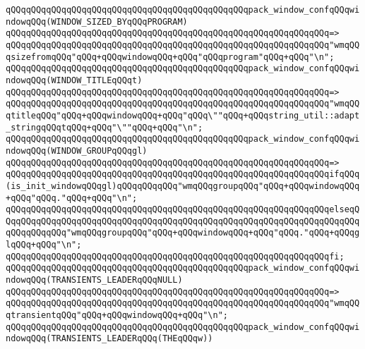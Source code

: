 \verb|qQQqqQQqqQQqqQQqqQQqqQQqqQQqqQQqqQQqqQQqqQQqqQQqpack_window_confqQQqwindowqQQq(WINDOW_SIZED_BYqQQqPROGRAM)|\newline
\verb|qQQqqQQqqQQqqQQqqQQqqQQqqQQqqQQqqQQqqQQqqQQqqQQqqQQqqQQqqQQqqQQq=>|\newline
\verb|qQQqqQQqqQQqqQQqqQQqqQQqqQQqqQQqqQQqqQQqqQQqqQQqqQQqqQQqqQQqqQQq"wmqQQqsizefromqQQq"qQQq+qQQqwindowqQQq+qQQq"qQQqprogram"qQQq+qQQq"\n";|\newline
\newline
\verb|qQQqqQQqqQQqqQQqqQQqqQQqqQQqqQQqqQQqqQQqqQQqqQQqpack_window_confqQQqwindowqQQq(WINDOW_TITLEqQQqt)|\newline
\verb|qQQqqQQqqQQqqQQqqQQqqQQqqQQqqQQqqQQqqQQqqQQqqQQqqQQqqQQqqQQqqQQq=>|\newline
\verb|qQQqqQQqqQQqqQQqqQQqqQQqqQQqqQQqqQQqqQQqqQQqqQQqqQQqqQQqqQQqqQQq"wmqQQqtitleqQQq"qQQq+qQQqwindowqQQq+qQQq"qQQq\""qQQq+qQQqstring_util::adapt_stringqQQqtqQQq+qQQq"\""qQQq+qQQq"\n";|\newline
\newline
\verb|qQQqqQQqqQQqqQQqqQQqqQQqqQQqqQQqqQQqqQQqqQQqqQQqpack_window_confqQQqwindowqQQq(WINDOW_GROUPqQQqgl)|\newline
\verb|qQQqqQQqqQQqqQQqqQQqqQQqqQQqqQQqqQQqqQQqqQQqqQQqqQQqqQQqqQQqqQQq=>|\newline
\verb|qQQqqQQqqQQqqQQqqQQqqQQqqQQqqQQqqQQqqQQqqQQqqQQqqQQqqQQqqQQqqQQqifqQQq(is_init_windowqQQqgl)qQQqqQQqqQQq"wmqQQqgroupqQQq"qQQq+qQQqwindowqQQq+qQQq"qQQq."qQQq+qQQq"\n";|\newline
\verb|qQQqqQQqqQQqqQQqqQQqqQQqqQQqqQQqqQQqqQQqqQQqqQQqqQQqqQQqqQQqqQQqelseqQQqqQQqqQQqqQQqqQQqqQQqqQQqqQQqqQQqqQQqqQQqqQQqqQQqqQQqqQQqqQQqqQQqqQQqqQQqqQQqqQQq"wmqQQqgroupqQQq"qQQq+qQQqwindowqQQq+qQQq"qQQq."qQQq+qQQqglqQQq+qQQq"\n";|\newline
\verb|qQQqqQQqqQQqqQQqqQQqqQQqqQQqqQQqqQQqqQQqqQQqqQQqqQQqqQQqqQQqqQQqfi;|\newline
\newline
\verb|qQQqqQQqqQQqqQQqqQQqqQQqqQQqqQQqqQQqqQQqqQQqqQQqpack_window_confqQQqwindowqQQq(TRANSIENTS_LEADERqQQqNULL)|\newline
\verb|qQQqqQQqqQQqqQQqqQQqqQQqqQQqqQQqqQQqqQQqqQQqqQQqqQQqqQQqqQQqqQQq=>|\newline
\verb|qQQqqQQqqQQqqQQqqQQqqQQqqQQqqQQqqQQqqQQqqQQqqQQqqQQqqQQqqQQqqQQq"wmqQQqtransientqQQq"qQQq+qQQqwindowqQQq+qQQq"\n";|\newline
\newline
\verb|qQQqqQQqqQQqqQQqqQQqqQQqqQQqqQQqqQQqqQQqqQQqqQQqpack_window_confqQQqwindowqQQq(TRANSIENTS_LEADERqQQq(THEqQQqw))|\newline
